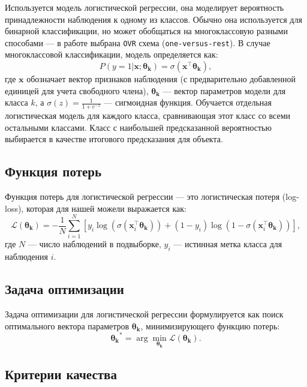 \documentclass{article}
\begin{document}
Используется модель логистической регрессии, она моделирует вероятность принадлежности наблюдения к одному из классов. Обычно она используется для бинарной классификации, но может обобщаться на многоклассовую разными способами --- в работе выбрана \texttt{OVR} схема (\texttt{one-versus-rest}). В случае многоклассовой классификации, модель определяется как:
\begin{equation}
    P(y=1 | \mathbf{x}; \boldsymbol{\theta_k}) = \sigma(\mathbf{x}^\top \boldsymbol{\theta_k}),
\end{equation}
где $\mathbf{x}$ обозначает вектор признаков наблюдения (с предварительно добавленной единицей для учета свободного члена), $\boldsymbol{\theta_k}$ --- вектор параметров модели для класса $k$, а $\sigma(z) = \frac{1}{1 + e^{-z}}$ --- сигмоидная функция. Обучается отдельная логистическая модель для каждого класса, сравнивающая этот класс со всеми остальными классами. Класс с наибольшей предсказанной вероятностью выбирается в качестве итогового предсказания для объекта.

\subsection{Функция потерь}

Функция потерь для логистической регрессии --- это логистическая потеря (log-loss), которая для нашей можели выражается как:
\begin{equation}
    \mathcal{L}(\boldsymbol{\theta_k}) = -\frac{1}{N} \sum_{i=1}^{N} \left[ y_i \log(\sigma(\mathbf{x}_i^\top \boldsymbol{\theta_k})) + (1 - y_i) \log(1 - \sigma(\mathbf{x}_i^\top \boldsymbol{\theta_k})) \right],
\end{equation}
где $N$ --- число наблюдений в подвыборке, $y_i$ --- истинная метка класса для наблюдения $i$.

\subsection{Задача оптимизации}

Задача оптимизации для логистической регрессии формулируется как поиск оптимального вектора параметров $\boldsymbol{\theta_k}$, минимизирующего функцию потерь:
\begin{equation}
    \boldsymbol{\theta_k}^* = \arg\min_{\boldsymbol{\theta_k}} \mathcal{L}(\boldsymbol{\theta_k}).
\end{equation}


\subsection{Критерии качества}
\end{document}
